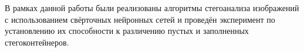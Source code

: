 

В рамках данной работы были реализованы алгоритмы стегоанализа изображений с использованием свёрточных нейронных сетей и проведён эксперимент по установлению их способности к различению пустых и заполненных стегоконтейнеров.

\clearpage
